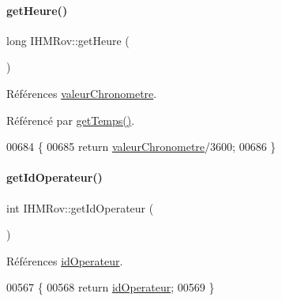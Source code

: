 \paragraph{\texorpdfstring{get\+Heure()}{getHeure()}}
{\footnotesize\ttfamily long I\+H\+M\+Rov\+::get\+Heure (\begin{DoxyParamCaption}{ }\end{DoxyParamCaption})\hspace{0.3cm}{\ttfamily [private]}}



Références \hyperlink{class_i_h_m_rov_a38ad5c20c2347825c237e9b85bb5c7e6}{valeur\+Chronometre}.



Référencé par \hyperlink{class_i_h_m_rov_aa6a269f311d527387ad3c9e22dd12d43}{get\+Temps()}.


\begin{DoxyCode}
00684 \{
00685     \textcolor{keywordflow}{return} \hyperlink{class_i_h_m_rov_a38ad5c20c2347825c237e9b85bb5c7e6}{valeurChronometre}/3600;
00686 \}
\end{DoxyCode}
\mbox{\label{class_i_h_m_rov_a79cddc1e905195eb11a8960abadf7d2f}} 
\paragraph{\texorpdfstring{get\+Id\+Operateur()}{getIdOperateur()}}
{\footnotesize\ttfamily int I\+H\+M\+Rov\+::get\+Id\+Operateur (\begin{DoxyParamCaption}{ }\end{DoxyParamCaption})\hspace{0.3cm}{\ttfamily [private]}}



Références \hyperlink{class_i_h_m_rov_a110af5c174e9fbba12bffbe0301ed690}{id\+Operateur}.


\begin{DoxyCode}
00567 \{
00568     \textcolor{keywordflow}{return} \hyperlink{class_i_h_m_rov_a110af5c174e9fbba12bffbe0301ed690}{idOperateur};
00569 \}
\end{DoxyCode}
\mbox{\label{class_i_h_m_rov_ad6d275fe98c3dd1e40b2ef0defff3be9}} 
